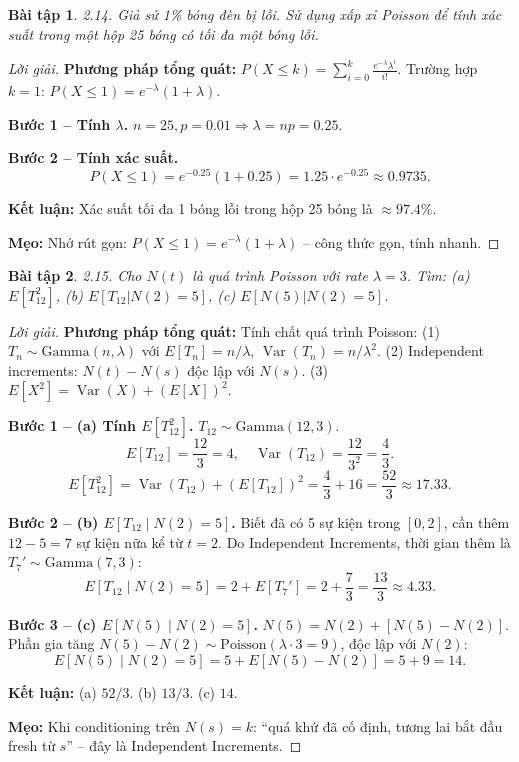 \documentclass[8pt,a4paper]{article}
\newtheorem{exercise}{Bài tập}
\newenvironment{solution}{\begin{proof}[Lời giải]}{\end{proof}}
\newcommand{\Var}{\operatorname{Var}}
\begin{document}
\begin{exercise}
2.14. Giả sử 1\% bóng đèn bị lỗi. Sử dụng xấp xỉ Poisson để tính xác suất trong một hộp 25 bóng có tối đa một bóng lỗi.
\end{exercise}
\begin{solution}
\textbf{Phương pháp tổng quát:} $P(X \leq k) = \sum_{i=0}^{k} \frac{e^{-\lambda}\lambda^i}{i!}$. Trường hợp $k=1$: $P(X \leq 1) = e^{-\lambda}(1 + \lambda)$.

\textbf{Bước 1 -- Tính $\lambda$.} $n = 25, p = 0.01 \Rightarrow \lambda = np = 0.25$.

\textbf{Bước 2 -- Tính xác suất.}
\[
  P(X \leq 1) = e^{-0.25}(1 + 0.25) = 1.25 \cdot e^{-0.25} \approx \boxed{0.9735}.
\]

\textbf{Kết luận:} Xác suất tối đa 1 bóng lỗi trong hộp 25 bóng là $\approx 97.4\%$.

\textbf{Mẹo:} Nhớ rút gọn: $P(X \leq 1) = e^{-\lambda}(1+\lambda)$ -- công thức gọn, tính nhanh.
\end{solution}

\begin{exercise}
2.15. Cho $N(t)$ là quá trình Poisson với rate $\lambda = 3$. Tìm: (a) $E[T_{12}^2]$, (b) $E[T_{12} | N(2) = 5]$, (c) $E[N(5) | N(2) = 5]$.
\end{exercise}
\begin{solution}
\textbf{Phương pháp tổng quát:} Tính chất quá trình Poisson: (1) $T_n \sim \text{Gamma}(n, \lambda)$ với $E[T_n] = n/\lambda$, $\Var(T_n) = n/\lambda^2$. (2) Independent increments: $N(t)-N(s)$ độc lập với $N(s)$. (3) $E[X^2] = \Var(X) + (E[X])^2$.

\textbf{Bước 1 -- (a) Tính $E[T_{12}^2]$.} $T_{12} \sim \text{Gamma}(12, 3)$.
\[
  E[T_{12}] = \frac{12}{3} = 4, \quad \Var(T_{12}) = \frac{12}{3^2} = \frac{4}{3}.
\]
\[
  E[T_{12}^2] = \Var(T_{12}) + (E[T_{12}])^2 = \frac{4}{3} + 16 = \boxed{\frac{52}{3} \approx 17.33}.
\]

\textbf{Bước 2 -- (b) $E[T_{12} \mid N(2) = 5]$.} Biết đã có 5 sự kiện trong $[0,2]$, cần thêm $12 - 5 = 7$ sự kiện nữa kể từ $t=2$. Do Independent Increments, thời gian thêm là $T_7' \sim \text{Gamma}(7, 3)$:
\[
  E[T_{12} \mid N(2)=5] = 2 + E[T_7'] = 2 + \frac{7}{3} = \boxed{\frac{13}{3} \approx 4.33}.
\]

\textbf{Bước 3 -- (c) $E[N(5) \mid N(2) = 5]$.} $N(5) = N(2) + [N(5)-N(2)]$. Phần gia tăng $N(5)-N(2) \sim \text{Poisson}(\lambda \cdot 3 = 9)$, độc lập với $N(2)$:
\[
  E[N(5) \mid N(2)=5] = 5 + E[N(5)-N(2)] = 5 + 9 = \boxed{14}.
\]

\textbf{Kết luận:} (a) $52/3$. (b) $13/3$. (c) $14$.

\textbf{Mẹo:} Khi conditioning trên $N(s) = k$: ``quá khứ đã cố định, tương lai bắt đầu fresh từ $s$'' -- đây là Independent Increments.
\end{solution}
\end{document}
